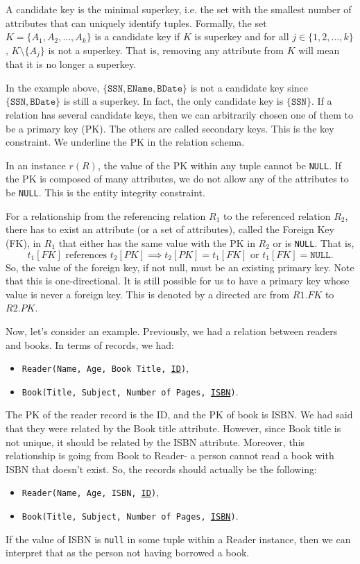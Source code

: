 \documentclass[a4paper, openany]{memoir}
\begin{document}
A candidate key is the minimal superkey, i.e. the set with the smallest number of attributes that can uniquely identify tuples. Formally, the set $K = \{A_1, A_2, \dots, A_k\}$ is a candidate key if $K$ is superkey and for all $j \in \{1, 2, \dots, k\}$, $K \setminus \{A_j\}$ is not a superkey. That is, removing any attribute from $K$ will mean that it is no longer a superkey. 

In the example above, $\{\texttt{SSN}, \texttt{EName}, \texttt{BDate}\}$ is not a candidate key since $\{\texttt{SSN}, \texttt{BDate}\}$ is still a superkey. In fact, the only candidate key is $\{\texttt{SSN}\}$. If a relation has several candidate keys, then we can arbitrarily chosen one of them to be a primary key (PK). The others are called secondary keys. This is the key constraint. We underline the PK in the relation schema.

In an instance $r(R)$, the value of the PK within any tuple cannot be \texttt{NULL}. If the PK is composed of many attributes, we do not allow any of the attributes to be \texttt{NULL}. This is the entity integrity constraint. 

For a relationship from the referencing relation $R_1$ to the referenced relation $R_2$, there has to exist an attribute (or a set of attributes), called the Foreign Key (FK), in $R_1$ that either has the same value with the PK in $R_2$ or is \texttt{NULL}. That is,
\[t_1[FK] \text{ references } t_2[PK] \implies t_2[PK] = t_1[FK] \text{ or } t_1[FK] = \texttt{NULL}.\]
So, the value of the foreign key, if not null, must be an existing primary key. Note that this is one-directional. It is still possible for us to have a primary key whose value is never a foreign key. This is denoted by a directed arc from $R1.FK$ to $R2.PK$.

Now, let's consider an example. Previously, we had a relation between readers and books. In terms of records, we had:
\begin{itemize}
    \item \texttt{Reader(Name, Age, Book Title, \underline{ID})},
    \item \texttt{Book(Title, Subject, Number of Pages, \underline{ISBN})}.
\end{itemize}
The PK of the reader record is the ID, and the PK of book is ISBN. We had said that they were related by the Book title attribute. However, since Book title is not unique, it should be related by the ISBN attribute. Moreover, this relationship is going from Book to Reader- a person cannot read a book with ISBN that doesn't exist. So, the records should actually be the following:
\begin{itemize}
    \item \texttt{Reader(Name, Age, ISBN, \underline{ID})},
    \item \texttt{Book(Title, Subject, Number of Pages, \underline{ISBN})}.
\end{itemize}
If the value of ISBN is \texttt{null} in some tuple within a Reader instance, then we can interpret that as the person not having borrowed a book.
\end{document}
